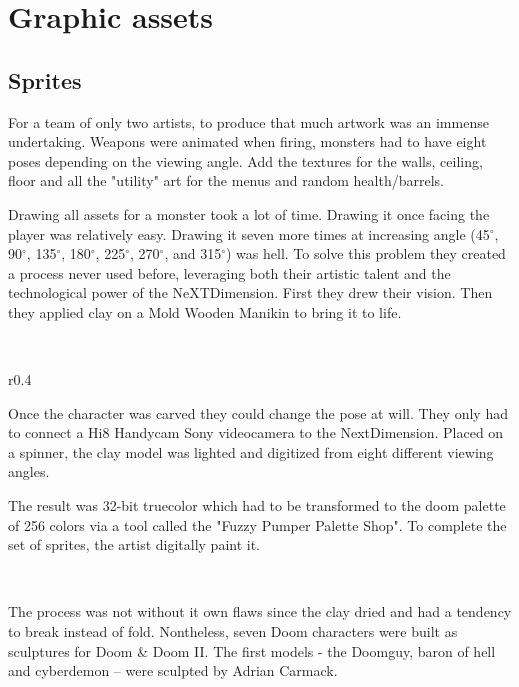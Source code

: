 \section{Graphic assets}

\subsection{Sprites}
For a team of only two artists, to produce that much artwork was an immense undertaking. Weapons were animated when firing, monsters had to have eight poses depending on the viewing angle. Add the textures for the walls, ceiling, floor and all the "utility" art for the menus and random health/barrels.\\
\par
Drawing all assets for a monster took a lot of time. Drawing it once facing the player was relatively easy. Drawing it seven more times at increasing angle (45$^{\circ}$, 90$^{\circ}$, 135$^{\circ}$, 180$^{\circ}$, 225$^{\circ}$, 270$^{\circ}$, and 315$^{\circ}$) was hell. To solve this problem they created a process never used before, leveraging both their artistic talent and the technological power of the NeXTDimension. First they drew their vision. Then they applied clay on a Mold Wooden Manikin to bring it to life.\\
\par


\\
\par

\begin{wrapfigure}[9]{r}{0.4\textwidth}
\centering
{}
\end{wrapfigure}
Once the character was carved they could change the pose at will. They only had to connect a Hi8 Handycam Sony videocamera to the NextDimension. Placed on a spinner, the clay model was lighted and digitized from eight different viewing angles.\\
\par
The result was 32-bit truecolor which had to be transformed to the doom palette of 256 colors via a tool called the "Fuzzy Pumper Palette Shop". To complete the set of sprites, the artist digitally paint it.\\
\par
{}\\
\par
The process was not without it own flaws since the clay dried and had a tendency to break instead of fold. Nontheless, seven Doom characters were built as sculptures for Doom \& Doom II. The first models - the Doomguy, baron of hell and cyberdemon -- were sculpted by Adrian Carmack.  \\
\par
{}\\
\pagebreak

